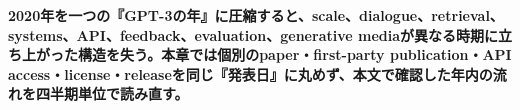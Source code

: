 \noindent\textbf{2020年を一つの『GPT-3の年』に圧縮すると、scale、dialogue、retrieval、systems、API、feedback、evaluation、generative mediaが異なる時期に立ち上がった構造を失う。本章では個別のpaper・first-party publication・API access・license・releaseを同じ『発表日』に丸めず、本文で確認した年内の流れを四半期単位で読み直す。}
